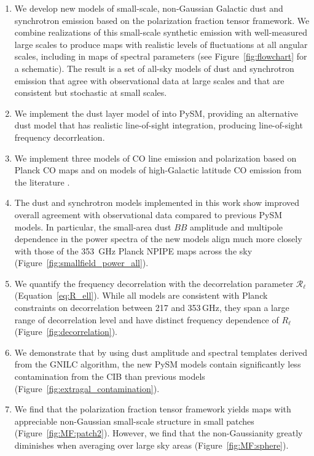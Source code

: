 \documentclass[twocolumn]{aastex631}
\begin{document}
\begin{enumerate}
    \item We develop new models of small-scale, non-Gaussian Galactic dust and synchrotron emission based on the polarization fraction tensor framework. We combine realizations of this small-scale synthetic emission with well-measured large scales to produce maps with realistic levels of fluctuations at all angular scales, including in maps of spectral parameters (see Figure~\ref{fig:flowchart} for a schematic). The result is a set of all-sky models of dust and synchrotron emission that agree with observational data at large scales and that are consistent but stochastic at small scales.
    \item We implement the dust layer model of \citet{Martinez-Solaeche:2018} into PySM, providing an alternative dust model that has realistic line-of-sight integration, producing line-of-sight frequency decorrleation.
    \item We implement three models of CO line emission and polarization based on Planck CO maps \citep{planck2013-p03a} and on models of high-Galactic latitude CO emission from the literature \citep{Puglisi:2017}.
    \item The dust and synchrotron models implemented in this work show improved overall agreement with observational data compared to previous PySM models. In particular, the small-area dust $BB$ amplitude and multipole dependence in the power spectra of the new models align much more closely with those of the 353~GHz Planck NPIPE maps across the sky (Figure~\ref{fig:smallfield_power_all}).
    \item We quantify the frequency decorrelation with the decorrelation parameter $\mathcal{R}_\ell$ (Equation~\ref{eq:R_ell}). While all models are consistent with Planck constraints on decorrelation between 217 and 353\,GHz, they span a large range of decorrelation level and have distinct frequency dependence of $R_\ell$ (Figure~\ref{fig:decorrelation}).
    \item We demonstrate that by using dust amplitude and spectral templates derived from the GNILC algorithm, the new PySM models contain significantly less contamination from the CIB than previous models (Figure~\ref{fig:extragal_contamination}).
    \item We find that the polarization fraction tensor framework yields maps with appreciable non-Gaussian small-scale structure in small patches (Figure~\ref{fig:MF:patch2}). However, we find that the non-Gaussianity greatly diminishes when averaging over large sky areas (Figure~\ref{fig:MF:sphere}).

\end{enumerate}
\end{document}
